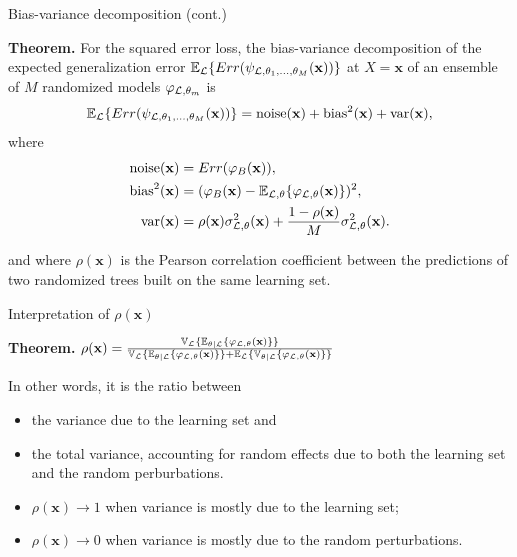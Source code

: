 \documentclass{beamer}
\begin{document}
\begin{frame}{Bias-variance decomposition (cont.)}

{\bf Theorem.}
For the squared error loss, the bias-variance decomposition of the expected
generalization error $\mathbb{E}_{\cal L} \{ Err( \psi_{{\cal L},\theta_1,\dots,\theta_M}(\mathbf{x}))
\}$ at $X=\mathbf{x}$ of an ensemble of $M$ randomized models $\varphi_{{\cal L},\theta_m}$ is
\begin{equation*}
\mathbb{E}_{\cal L} \{ Err(\psi_{{\cal L},\theta_1,\dots,\theta_M}(\mathbf{x})) \} = \text{noise}(\mathbf{x}) + \text{bias}^2(\mathbf{x}) + \text{var}(\mathbf{x}),
\end{equation*}
where
\begin{align*}
\text{noise}(\mathbf{x}) &= Err(\varphi_B(\mathbf{x})), \\
\text{bias}^2(\mathbf{x}) &= (\varphi_B(\mathbf{x}) - \mathbb{E}_{{\cal L},\theta} \{ \varphi_{{\cal L},\theta}(\mathbf{x}) \} )^2, \\
\text{var}(\mathbf{x}) &= \rho(\mathbf{x}) \sigma^2_{{\cal L},\theta}(\mathbf{x}) + \frac{1 - \rho(\mathbf{x})}{M} \sigma^2_{{\cal L},\theta}(\mathbf{x}).
\end{align*}

and where $\rho(\mathbf{x})$ is the Pearson correlation coefficient between the predictions of two randomized trees built on the same learning set.

\end{frame}

\begin{frame}{Interpretation of $\rho(\mathbf{x})$}

{\bf Theorem.} $\rho(\mathbf{x}) = \frac{\mathbb{V}_{\cal L} \{ \mathbb{E}_{\theta|{\cal L}} \{ \varphi_{{\cal L},\theta}(\mathbf{x}) \} \}}{\mathbb{V}_{\cal L} \{ \mathbb{E}_{\theta|{\cal L}} \{ \varphi_{{\cal L},\theta}(\mathbf{x}) \} \} + \mathbb{E}_{\cal L} \{ \mathbb{V}_{\theta|{\cal L}} \{ \varphi_{{\cal L},\theta}(\mathbf{x}) \} \}}$

\vspace{1cm}

In other words, it is the ratio between
\begin{itemize}
\item the variance due to the learning set and
\item the total variance, accounting for random effects due to both the learning set and the random perburbations.
\end{itemize}

\begin{itemize}
\item $\rho(\mathbf{x}) \to 1$ when variance is mostly due to the learning set;
\item $\rho(\mathbf{x}) \to 0$ when variance is mostly due to the random perturbations.
\end{itemize}

\end{frame}
\end{document}
